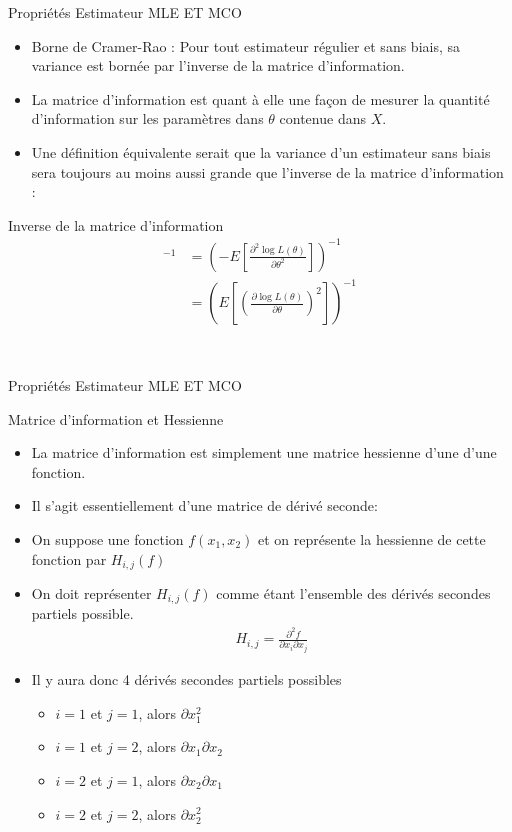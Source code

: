 \documentclass{beamer}
\begin{document}
\begin{frame}{Propriétés Estimateur MLE ET MCO}
\begin{itemize}
\item Borne de Cramer-Rao : Pour tout estimateur régulier et sans biais, sa variance
est bornée par l’inverse de la matrice d’information.
\item La matrice d’information est quant à elle une façon de mesurer la quantité
d’information sur les paramètres dans $\theta$ contenue dans $X$.
\item Une définition équivalente serait que la variance d’un estimateur sans biais
sera toujours au moins aussi grande que l’inverse de la matrice d’information :
\end{itemize}
\begin{block}{Inverse de la matrice d'information}
\begin{align*}
[I(\theta)]^{-1} &=\left( -E \left[\frac{\partial^2 \log L(\theta)}{\partial \theta^2} \right] \right)^{-1} \\ &=\left( E \left[ \left(\frac{\partial \log L(\theta)}{\partial \theta}\right)^2 \right] \right)^{-1}
\end{align*}
\end{block}
\\
\end{frame}

\begin{frame}{Propriétés Estimateur MLE ET MCO}

\begin{block}{Matrice d'information et Hessienne}
\begin{itemize}
\item La matrice d'information est simplement une matrice hessienne d'une d'une fonction.
\item Il s'agit essentiellement d'une matrice de dérivé seconde: 
\item On suppose une fonction $f(x_1, x_2)$ et on représente la hessienne de cette fonction par $H_{i,j}(f)$
\item On doit représenter $H_{i,j}(f)$ comme étant l'ensemble des dérivés secondes partiels possible.
\begin{align*}
H_{i,j}=\frac{\partial^2 f}{\partial x_i \partial x_j}
\end{align*}
\item Il y aura donc 4 dérivés secondes partiels possibles
\begin{itemize}
\item $i=1$ et $j=1$, alors $\partial x_1^2$
\item $i=1$ et $j=2$, alors $\partial x_1 \partial x_2$
\item $i=2$ et $j=1$, alors $\partial x_2 \partial x_1$
\item $i=2$ et $j=2$, alors $\partial x_2^2$
\end{itemize}
\end{itemize}
\end{block}
\end{frame}
\end{document}

